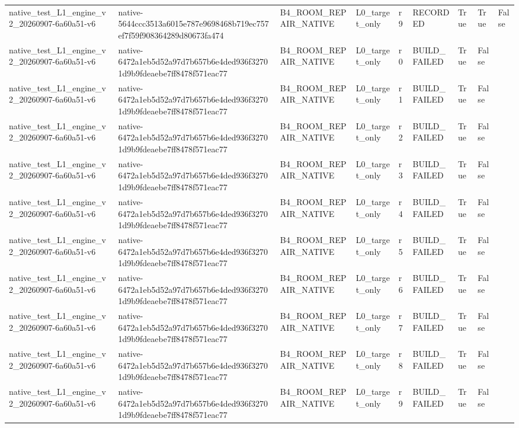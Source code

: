 \begin{tabular}{lllllllll}
native\_test\_L1\_engine\_v2\_20260907-6a60a51-v6 & native-5644ccc3513a6015e787e9698468b719ec757ef7f59f908364289d80673fa474 & B4\_ROOM\_REPAIR\_NATIVE & L0\_target\_only & r9 & RECORDED & True & True & False \\
native\_test\_L1\_engine\_v2\_20260907-6a60a51-v6 & native-6472a1eb5d52a97d7b657b6e4ded936f32701d9b9fdeaebe7ff8478f571eac77 & B4\_ROOM\_REPAIR\_NATIVE & L0\_target\_only & r0 & BUILD\_FAILED & True & False &  \\
native\_test\_L1\_engine\_v2\_20260907-6a60a51-v6 & native-6472a1eb5d52a97d7b657b6e4ded936f32701d9b9fdeaebe7ff8478f571eac77 & B4\_ROOM\_REPAIR\_NATIVE & L0\_target\_only & r1 & BUILD\_FAILED & True & False &  \\
native\_test\_L1\_engine\_v2\_20260907-6a60a51-v6 & native-6472a1eb5d52a97d7b657b6e4ded936f32701d9b9fdeaebe7ff8478f571eac77 & B4\_ROOM\_REPAIR\_NATIVE & L0\_target\_only & r2 & BUILD\_FAILED & True & False &  \\
native\_test\_L1\_engine\_v2\_20260907-6a60a51-v6 & native-6472a1eb5d52a97d7b657b6e4ded936f32701d9b9fdeaebe7ff8478f571eac77 & B4\_ROOM\_REPAIR\_NATIVE & L0\_target\_only & r3 & BUILD\_FAILED & True & False &  \\
native\_test\_L1\_engine\_v2\_20260907-6a60a51-v6 & native-6472a1eb5d52a97d7b657b6e4ded936f32701d9b9fdeaebe7ff8478f571eac77 & B4\_ROOM\_REPAIR\_NATIVE & L0\_target\_only & r4 & BUILD\_FAILED & True & False &  \\
native\_test\_L1\_engine\_v2\_20260907-6a60a51-v6 & native-6472a1eb5d52a97d7b657b6e4ded936f32701d9b9fdeaebe7ff8478f571eac77 & B4\_ROOM\_REPAIR\_NATIVE & L0\_target\_only & r5 & BUILD\_FAILED & True & False &  \\
native\_test\_L1\_engine\_v2\_20260907-6a60a51-v6 & native-6472a1eb5d52a97d7b657b6e4ded936f32701d9b9fdeaebe7ff8478f571eac77 & B4\_ROOM\_REPAIR\_NATIVE & L0\_target\_only & r6 & BUILD\_FAILED & True & False &  \\
native\_test\_L1\_engine\_v2\_20260907-6a60a51-v6 & native-6472a1eb5d52a97d7b657b6e4ded936f32701d9b9fdeaebe7ff8478f571eac77 & B4\_ROOM\_REPAIR\_NATIVE & L0\_target\_only & r7 & BUILD\_FAILED & True & False &  \\
native\_test\_L1\_engine\_v2\_20260907-6a60a51-v6 & native-6472a1eb5d52a97d7b657b6e4ded936f32701d9b9fdeaebe7ff8478f571eac77 & B4\_ROOM\_REPAIR\_NATIVE & L0\_target\_only & r8 & BUILD\_FAILED & True & False &  \\
native\_test\_L1\_engine\_v2\_20260907-6a60a51-v6 & native-6472a1eb5d52a97d7b657b6e4ded936f32701d9b9fdeaebe7ff8478f571eac77 & B4\_ROOM\_REPAIR\_NATIVE & L0\_target\_only & r9 & BUILD\_FAILED & True & False &  \\

\end{tabular}
